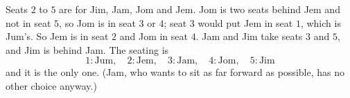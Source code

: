 Seats $2$ to $5$ are for Jim, Jam, Jom and Jem. Jom is two seats behind Jem and not in seat $5$, so Jom is in seat $3$ or $4$; seat $3$ would put Jem in seat $1$, which is Jum's. So Jem is in seat $2$ and Jom in seat $4$. Jam and Jim take seats $3$ and $5$, and Jim is behind Jam. The seating is
\[\boxed{1:\text{Jum},\quad2:\text{Jem},\quad3:\text{Jam},\quad4:\text{Jom},\quad5:\text{Jim}}\]
and it is the only one. (Jam, who wants to sit as far forward as possible, has no other choice anyway.)
